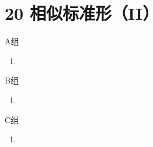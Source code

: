 \section*{20 相似标准形（II）}

\vspace{2ex}

\centerline{\heiti A组}
\begin{enumerate}
    \item
\end{enumerate}

\centerline{\heiti B组}
\begin{enumerate}
    \item
\end{enumerate}

\centerline{\heiti C组}
\begin{enumerate}
    \item
\end{enumerate}

\clearpage
